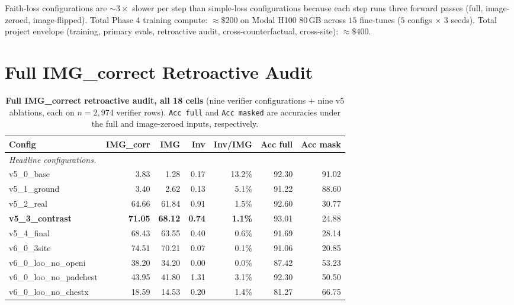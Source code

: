 \documentclass{article}
\begin{document}
Faith-loss configurations are $\sim 3\times$ slower per step than
simple-loss configurations because each step runs three forward passes
(full, image-zeroed, image-flipped). Total Phase 4 training compute:
$\approx \$200$ on Modal H100 80\,GB across $15$ fine-tunes ($5$
configs $\times$ $3$ seeds). Total project envelope (training, primary
evals, retroactive audit, cross-counterfactual, cross-site):
$\approx \$400$.

\section{Full IMG\_correct Retroactive Audit}
\label{app:audit}

\begin{table}[t]
\centering
\small
\caption{\textbf{Full IMG\_correct retroactive audit, all 18 cells}
(nine verifier configurations $+$ nine v5 ablations, each on $n=2{,}974$
verifier rows). \texttt{Acc full} and \texttt{Acc masked} are accuracies
under the full and image-zeroed inputs, respectively.}
\label{tab:audit-full}
\setlength{\tabcolsep}{4.0pt}
\begin{tabular}{lrrrrrr}
\toprule
\textbf{Config} & \textbf{IMG\_corr} & \textbf{IMG} & \textbf{Inv} & \textbf{Inv/IMG} & \textbf{Acc full} & \textbf{Acc mask}\\
\midrule
\multicolumn{7}{l}{\emph{Headline configurations.}}\\
v5\_0\_base                   & 3.83  & 1.28  & 0.17 & 13.2\% & 92.30 & 91.02\\
v5\_1\_ground                 & 3.40  & 2.62  & 0.13 & \phantom{0}5.1\% & 91.22 & 88.60\\
v5\_2\_real                   & 64.66 & 61.84 & 0.91 & \phantom{0}1.5\% & 92.60 & 30.77\\
\textbf{v5\_3\_contrast}      & \textbf{71.05} & \textbf{68.12} & \textbf{0.74} & \textbf{1.1\%} & 93.01 & 24.88\\
v5\_4\_final                  & 68.43 & 63.55 & 0.40 & \phantom{0}0.6\% & 91.69 & 28.14\\
v6\_0\_3site                  & 74.51 & 70.21 & 0.07 & \phantom{0}0.1\% & 91.06 & 20.85\\
v6\_0\_loo\_no\_openi         & 38.20 & 34.20 & 0.00 & \phantom{0}0.0\% & 87.42 & 53.23\\
v6\_0\_loo\_no\_padchest      & 43.95 & 41.80 & 1.31 & \phantom{0}3.1\% & 92.30 & 50.50\\
v6\_0\_loo\_no\_chestx        & 18.59 & 14.53 & 0.20 & \phantom{0}1.4\% & 81.27 & 66.75\\

\end{tabular}
\end{table}
\end{document}
